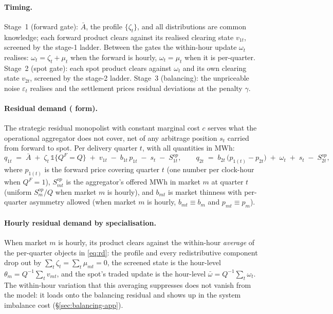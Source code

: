 \documentclass[11pt,a4paper]{article}
\theoremstyle{definition}
\theoremstyle{remark}
\theoremstyle{plain}
\begin{document}
\paragraph{Timing.} Stage~1 (forward gate): $\bar A$, the profile $\{\zeta_t\}$, and all distributions are common knowledge; each forward product clears against its realised clearing state $v_{1t}$, screened by the stage-1 ladder. Between the gates the within-hour update $\omega_t$ realises: $\omega_t = \zeta_t + \mu_t$ when the forward is hourly, $\omega_t = \mu_t$ when it is per-quarter. Stage~2 (spot gate): each spot product clears against $\omega_t$ and its own clearing state $v_{2t}$, screened by the stage-2 ladder. Stage~3 (balancing): the unpriceable noise $\varepsilon_t$ realises and the settlement prices residual deviations at the penalty $\gamma$.

\paragraph{Residual demand (\citet{ito_reguant_2016} form).} The strategic residual monopolist with constant marginal cost $c$ serves what the operational aggregator does not cover, net of any arbitrage position $s_t$ carried from forward to spot. Per delivery quarter $t$, with all quantities in MWh:
\begin{equation}
q_{1t} \;=\; \bar A \;+\; \zeta_t\,\mathds{1}\{Q^F = Q\} \;+\; v_{1t} \;-\; b_{1t}\, p_{1t} \;-\; s_t \;-\; S^{op}_{1t},
\qquad
q_{2t} \;=\; b_{2t}\,\bigl(p_{1(t)} - p_{2t}\bigr) \;+\; \omega_t \;+\; s_t \;-\; S^{op}_{2t},
\label{eq:rd}
\end{equation}
where $p_{1(t)}$ is the forward price covering quarter $t$ (one number per clock-hour when $Q^F = 1$), $S^{op}_{mt}$ is the aggregator's offered MWh in market $m$ at quarter $t$ (uniform $S^{op}_m / Q$ when market $m$ is hourly), and $b_{mt}$ is market thinness with per-quarter asymmetry allowed (when market $m$ is hourly, $b_{mt} \equiv b_m$ and $p_{mt} \equiv p_m$).

\paragraph{Hourly residual demand by specialisation.} When market $m$ is hourly, its product clears against the within-hour \emph{average} of the per-quarter objects in \eqref{eq:rd}: the profile and every redistributive component drop out by $\sum_t \zeta_t = \sum_t \mu_{mt} = 0$, the screened state is the hour-level $\theta_m = Q^{-1}\sum_t v_{mt}$, and the spot's traded update is the hour-level $\bar\omega = Q^{-1}\sum_t \omega_t$. The within-hour variation that this averaging suppresses does not vanish from the model: it loads onto the balancing residual and shows up in the system imbalance cost (\S\ref{sec:balancing-app}).
\end{document}

